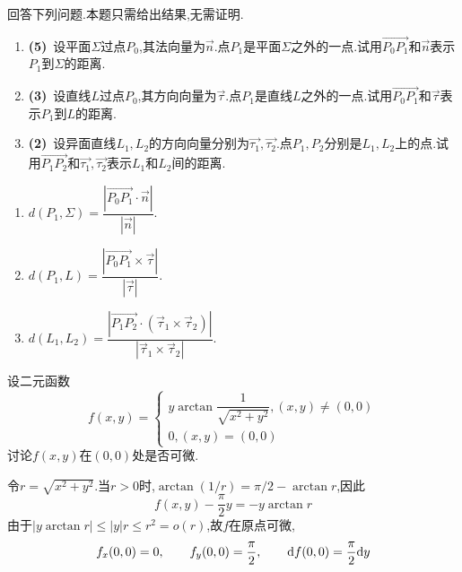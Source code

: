 \documentclass{ctexart}
\begin{document}
\begin{problem}[5.(10\songti{分})]
回答下列问题.本题只需给出结果,无需证明.
        \begin{enumerate}[label=\tbf{(\arabic*)}]
            \item \textbf{(5)}\ 设平面$\Sigma$过点$P_0$,其法向量为$\vec{n}$.点$P_1$是平面$\Sigma$之外的一点.试用$\overrightarrow{P_0P_1}$和$\vec{n}$表示$P_1$到$\Sigma$的距离.
            \item \textbf{(3)}\ 设直线$L$过点$P_0$,其方向向量为$\vec{\tau}$.点$P_1$是直线$L$之外的一点.试用$\overrightarrow{P_0P_1}$和$\vec{\tau}$表示$P_1$到$L$的距离.
            \item \textbf{(2)}\ 设异面直线$L_1,L_2$的方向向量分别为$\vec{\tau_1},\vec{\tau_2}$.点$P_1,P_2$分别是$L_1,L_2$上的点.试用$\overrightarrow{P_1P_2}$和$\vec{\tau_1},\vec{\tau_2}$表示$L_1$和$L_2$间的距离.
        \end{enumerate}
\end{problem}
\begin{solution}
\begin{enumerate}[label=\tbf{(\arabic*)},leftmargin=*]
\item $\displaystyle d(P_1,\Sigma)=\dfrac{|\overrightarrow{P_0P_1}\cdot\vec n|}{|\vec n|}$.
\item $\displaystyle d(P_1,L)=\dfrac{|\overrightarrow{P_0P_1}\times\vec\tau|}{|\vec\tau|}$.
\item $\displaystyle d(L_1,L_2)=\dfrac{|\overrightarrow{P_1P_2}\cdot(\vec\tau_1\times\vec\tau_2)|}{|\vec\tau_1\times\vec\tau_2|}$.
\end{enumerate}
\end{solution}
\begin{problem}[6.(10\songti{分})]
设二元函数\[f(x,y)=\left\{\begin{array}{l}
            y\arctan\dfrac{1}{\sqrt{x^2+y^2}},(x,y)\neq(0,0)\\
            0,(x,y)=(0,0)
        \end{array}\right.\]讨论$f(x,y)$在$(0,0)$处是否可微.
\end{problem}
\begin{solution}
令$r=\sqrt{x^2+y^2}$.当$r>0$时,$\arctan(1/r)=\pi/2-\arctan r$,因此
\[f(x,y)-\dfrac\pi2y=-y\arctan r\]
由于$|y\arctan r|\leqslant |y|r\leqslant r^2=o(r)$,故$f$在原点可微,
\[f_x(0,0)=0,\qquad f_y(0,0)=\dfrac\pi2,\qquad \mathrm{d} f(0,0)=\dfrac\pi2\mathrm{d} y\]
\end{solution}
\end{document}
